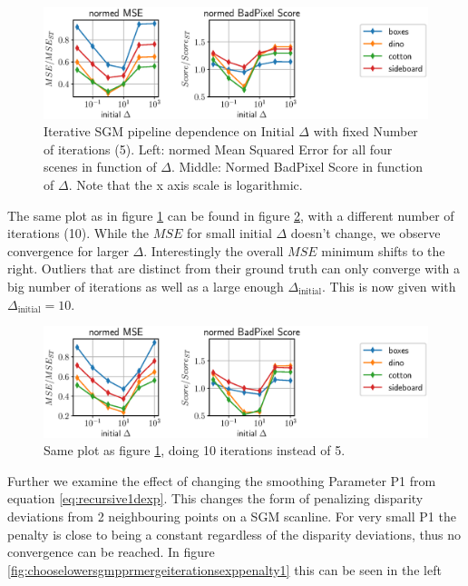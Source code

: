 \documentclass  [
  paper    = a4,
  BCOR     = 10mm,
  twoside,
  fontsize = 12pt,
  fleqn,
  toc      = bibnumbered,
  toc      = listofnumbered,
  numbers  = noendperiod,
  headings = normal,
  listof   = leveldown,
  version  = 3.03
]                                       {scrreprt}
\begin{document}
\begin{figure}
	\centering
	\includegraphics[width=1\linewidth]{images/choose_lower_sgm_ppr_iterations_5_smoothing_delta}
	\caption[Iterative SGM dependence on Initial Delta with 10 iterations]{Iterative SGM pipeline dependence on Initial $\Delta$ with fixed Number of iterations (5). Left: normed Mean Squared Error for all four scenes in function of $\Delta$. Middle: Normed BadPixel Score in function of $\Delta$. Note that the x axis scale is logarithmic.}
	\label{fig:chooselowersgmppriterations5smoothingdelta}
\end{figure}
The same plot as in figure \ref{fig:chooselowersgmppriterations5smoothingdelta} can be found in figure \ref{fig:chooselowersgmppriterations10smoothingdelta}, with a different number of iterations (10). While the $MSE$ for small initial $\Delta$ doesn't change, we observe convergence for larger $\Delta$. Interestingly the overall $MSE$ minimum shifts to the right. Outliers that are distinct from their ground truth can only converge with a big number of iterations as well as a large enough $\Delta_\text{initial}$. This is now given with $\Delta_\text{initial} = 10$.
\begin{figure}
	\centering
	\includegraphics[width=1\linewidth]{images/choose_lower_sgm_ppr_iterations_10_smoothing_delta}
	\caption[Iterative SGM dependence on Initial Delta with 10 iterations]{Same plot as figure \ref{fig:chooselowersgmppriterations5smoothingdelta}, doing 10 iterations instead of 5.}
	\label{fig:chooselowersgmppriterations10smoothingdelta}
\end{figure}

Further we examine the effect of changing the smoothing Parameter P1 from equation \ref{eq:recursive1dexp}. This changes the form of penalizing disparity deviations from 2 neighbouring points on a SGM scanline. For very small P1 the penalty is close to being a constant regardless of the disparity deviations, thus no convergence can be reached. In figure \ref{fig:chooselowersgmpprmergeiterationsexppenalty1} this can be seen in the left 
\end{document}
